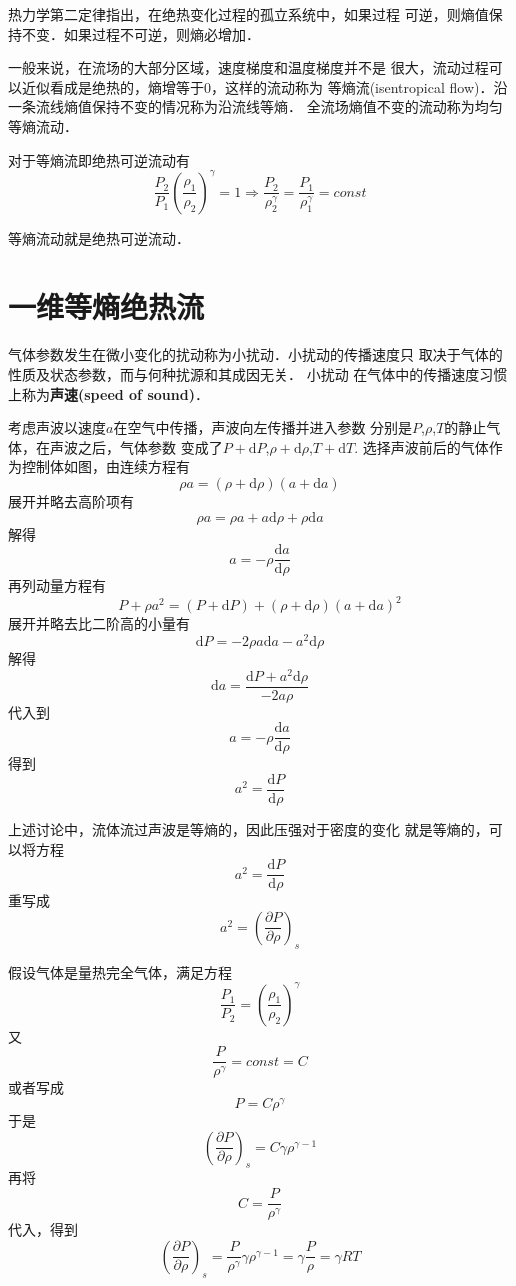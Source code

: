 热力学第二定律指出，在绝热变化过程的孤立系统中，如果过程
可逆，则熵值保持不变．如果过程不可逆，则熵必增加．

一般来说，在流场的大部分区域，速度梯度和温度梯度并不是
很大，流动过程可以近似看成是绝热的，熵增等于0，这样的流动称为
等熵流(isentropical flow)．沿一条流线熵值保持不变的情况称为沿流线等熵．
全流场熵值不变的流动称为均匀等熵流动．

对于等熵流即绝热可逆流动有
\[
	\frac{P_2}{P_1}\left(\frac{\rho_1}{\rho_2}\right)^\gamma=1\Rightarrow
	\frac{P_2}{\rho_2^\gamma}=\frac{P_1}{\rho_1^\gamma}=const
\]

\begin{notice}
等熵流动就是绝热可逆流动．
\end{notice}


\section{一维等熵绝热流}
气体参数发生在微小变化的扰动称为小扰动．小扰动的传播速度只
取决于气体的性质及状态参数，而与何种扰源和其成因无关． 小扰动
在气体中的传播速度习惯上称为{\bfseries 声速(speed of sound)}．

考虑声波以速度$a$在空气中传播，声波向左传播并进入参数
分别是$P$,$\rho$,$T$的静止气体，在声波之后，气体参数
变成了$P+\mathrm{d}P $,$\rho+\mathrm{d}\rho$,$T+\mathrm{d}T $.
选择声波前后的气体作为控制体{\color{red}如图}，由连续方程有
\[
  \rho a=(\rho+\mathrm{d}\rho)(a+\mathrm{d}a)
\]
展开并略去高阶项有
\[
  \rho a=\rho a+a \mathrm{d}\rho+\rho \mathrm{d}a 
\]
解得
\[
  a=-\rho \frac{\mathrm{d}a }{\mathrm{d}\rho}
\]
再列动量方程有
\[
  P+\rho a^2=(P+\mathrm{d}P)+(\rho+\mathrm{d}\rho)(a+\mathrm{d}a)^2
\]
展开并略去比二阶高的小量有
\[
  \mathrm{d}P=-2\rho a \mathrm{d}a-a^2 \mathrm{d}\rho
\]
解得
\[
  \mathrm{d}a =\frac{\mathrm{d}P+a^2 \mathrm{d}\rho}{-2a \rho}
\]
代入到
\[
  a=-\rho \frac{\mathrm{d}a}{\mathrm{d}\rho} 
\]
得到
\[
  a^2=\frac{\mathrm{d}P}{\mathrm{d}\rho}
\]

上述讨论中，流体流过声波是等熵的，因此压强对于密度的变化
就是等熵的，可以将方程
\[
  a^2=\frac{\mathrm{d}P }{\mathrm{d}\rho}
\]
重写成
\[
  a^2=\left(\frac{\partial P }{\partial \rho}\right)_s
\]

假设气体是量热完全气体，满足方程
\[
  \frac{{P_1}}{P_2}=\left(\frac{\rho_1}{\rho_2}\right)^\gamma
\]
又
\[
  \frac{P}{\rho^\gamma}=const=C 
\]
或者写成
\[
  P=C \rho^\gamma
\]
于是
\[
  \left(\frac{\partial P }{\partial \rho}\right)_s=C \gamma \rho^{\gamma-1}
\]
再将
\[
  C=\frac{P}{\rho^\gamma}
\]
代入，得到
\[
  \left(\frac{\partial P }{\partial \rho}\right)_s=\frac{P}{\rho^\gamma}\gamma \rho^{\gamma-1}
  =\gamma \frac{P}{\rho}=\gamma RT 
\]

